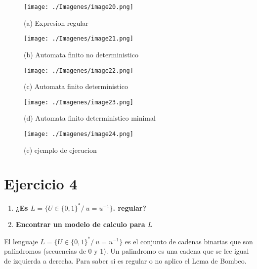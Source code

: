 \documentclass{article}
\begin{document}
        \begin{figure}[!h]
            \centering
            \texttt{[image: ./Imagenes/image20.png]}
            \label{fig:label4}
            \caption*{(a) Expresion regular}
        \end{figure}

        \begin{figure}[!h]
            \centering
            \texttt{[image: ./Imagenes/image21.png]}
            \label{fig:label4}
            \caption*{(b) Automata finito no deterministico}
        \end{figure}

        \newpage

        \begin{figure}[!h]
            \centering
            \texttt{[image: ./Imagenes/image22.png]}
            \label{fig:label4}
            \caption*{(c) Automata finito  deterministico}
        \end{figure}

        \begin{figure}[!h]
            \centering
            \texttt{[image: ./Imagenes/image23.png]}
            \label{fig:label4}
            \caption*{(d) Automata finito deterministico minimal}
        \end{figure}

        \newpage
        \begin{figure}[!h]
            \centering
            \texttt{[image: ./Imagenes/image24.png]}
            \label{fig:label4}
            \caption*{(e) ejemplo de ejecucion}
        \end{figure}

        


        \newpage


        \section{Ejercicio 4}
        \begin{enumerate}
            \item \textbf{¿Es $L = \{ U \in \{0, 1\}^* /\  u=u^{-1} \}$. regular? }
            \item \textbf{Encontrar un modelo de calculo para $L$ }
        \end{enumerate}
        El lenguaje $L = \{ U \in \{0, 1\}^* /\  u=u^{-1} \}$ es el conjunto de cadenas binarias que son palíndromos (secuencias de 0 y 1). Un palindromo es 
        una cadena que se lee igual de izquierda a derecha. Para saber si es regular o no aplico el Lema de Bombeo.
        \vspace{\baselineskip} %
\end{document}
